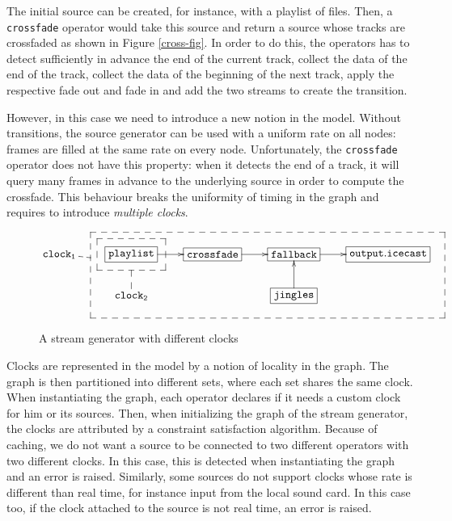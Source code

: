 \documentclass{llncs}
\begin{document}
The initial source can be created, for instance, with a playlist of files. Then,
a \texttt{crossfade} operator would take this source and return a source whose tracks are 
crossfaded as shown in Figure \ref{cross-fig}. In order to do this, the operators has to 
detect sufficiently in advance the end of the current track, collect the data of the
end of the track, collect the data of the beginning of the next track, apply the respective
fade out and fade in and add the two streams to create the transition.

However, in this case we need to introduce a new notion in the model. Without transitions, the 
source generator can be used with a uniform rate on all nodes: frames are filled
at the same rate on every node. Unfortunately, the \texttt{crossfade} operator
does not have this property: when it detects the end of a track, it will query many frames in advance 
to the underlying source in order to compute the crossfade. This behaviour breaks the uniformity of 
timing in the graph and requires to introduce \textit{multiple clocks}.


\begin{figure}[htn]
 \begin{center}
\[
\def\f{\save
*+<15pt>[F--]\frm{}\ar @{--} "2,2"\restore}%
\def\g{\save
"2,4"."1,2"."1,5"!C*+<27pt>[F--]\frm{}\ar @{--} "1,1"\restore}%
\xymatrix{
   \mathtt{clock_1} & *+[F]{\mathtt{playlist}}\ar[r]\f&*+[F]{\mathtt{crossfade}}\ar[r]&  *+[F]{\mathtt{fallback}}\ar[r]&
  *+[F]{\mathtt{output.icecast}}\\
   &\mathtt{clock_2} &  & *+[F]{\mathtt{jingles}}\ar[u]\g& 
}
\]
\end{center}
 \caption{A stream generator with different clocks}
\end{figure}

Clocks are represented in the model by a notion of locality in the graph. The graph is then partitioned into 
different sets, where each set shares the same clock.
When instantiating the graph, each operator declares if it needs a custom clock for him or its sources. 
Then, when initializing the graph of the stream generator, the clocks are attributed by a constraint 
satisfaction algorithm. Because of caching, we do not want a source to be connected to two different operators with 
two different clocks. In this case, this is detected when instantiating the graph and an error is raised.
Similarly, some sources do not support clocks whose rate is different than real time, for instance input 
from the local sound card. In this case too, if the clock attached to the source is not real time, an error
is raised.
\end{document}
